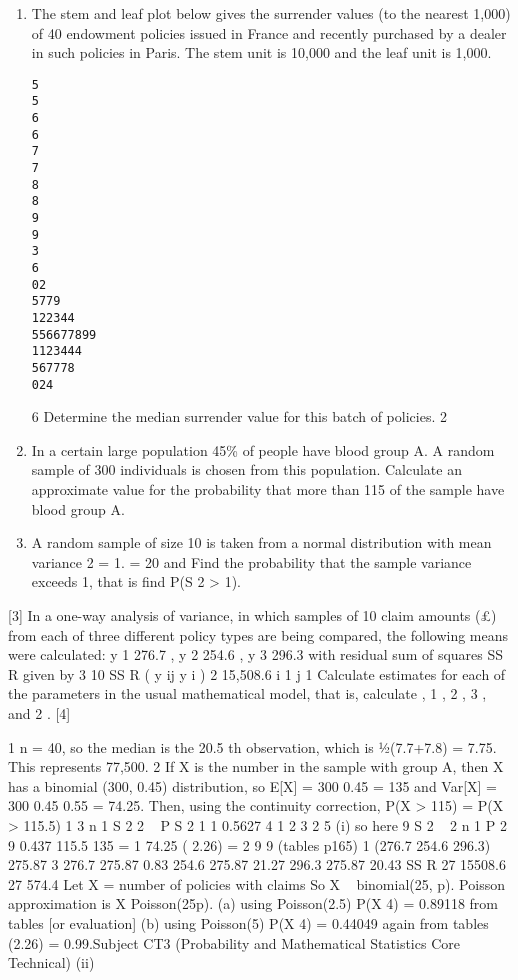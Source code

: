 \documentclass[a4paper,12pt]{article}
\begin{document}
\begin{enumerate}

\item %
The stem and leaf plot below gives the surrender values (to the nearest 1,000) of 40
endowment policies issued in France and recently purchased by a dealer in such
policies in Paris. The stem unit is 10,000 and the leaf unit is 1,000.
\begin{verbatim}
5
5
6
6
7
7
8
8
9
9
3
6
02
5779
122344
556677899
1123444
567778
024
\end{verbatim}

6
Determine the median surrender value for this batch of policies.
2
\item In a certain large population 45\% of people have blood group A. A random sample of 300 individuals is chosen from this population.
Calculate an approximate value for the probability that more than 115 of the sample have blood group A.


\item
A random sample of size 10 is taken from a normal distribution with mean variance 2 = 1.
= 20 and
Find the probability that the sample variance exceeds 1, that is find P(S 2 > 1).

\end{enumerate}
[3]
In a one-way analysis of variance, in which samples of 10 claim amounts (£) from each of three different policy types are being compared, the following means were
calculated:
y 1
276.7 ,
y 2
254.6 ,
y 3
296.3
with residual sum of squares SS R given by
3 10
SS R
( y ij
y i ) 2 15,508.6
i 1 j 1
Calculate estimates for each of the parameters in the usual mathematical model, that
is, calculate , 1 , 2 , 3 , and 2 .
[4]

\newpage
1 n = 40, so the median is the 20.5 th observation, which is 1⁄2(7.7+7.8) = 7.75.
This represents 77,500.
2 If X is the number in the sample with group A, then X has a binomial (300, 0.45)
distribution, so
E[X] = 300
0.45 = 135 and Var[X] = 300
0.45
0.55 = 74.25.
Then, using the continuity correction,
P(X > 115) = P(X > 115.5) 1
3
n 1 S 2
2
~
P S 2 1
1 0.5627
4
1
2
3
2
5
(i)
so here 9 S 2 ~
2
n 1
P
2
9
0.437
115.5 135
= 1
74.25
( 2.26) =
2
9
9
(tables p165)
1
(276.7 254.6 296.3) 275.87
3
276.7 275.87 0.83
254.6 275.87
21.27
296.3 275.87 20.43
SS R
27
15508.6
27
574.4
Let X = number of policies with claims
So X ~ binomial(25, p).
Poisson approximation is X Poisson(25p).
(a) using Poisson(2.5)
P(X 4) = 0.89118 from tables [or evaluation]
(b) using Poisson(5)
P(X 4) = 0.44049 again from tables
(2.26) = 0.99.Subject CT3 (Probability and Mathematical Statistics Core Technical)
(ii)
\end{document}
